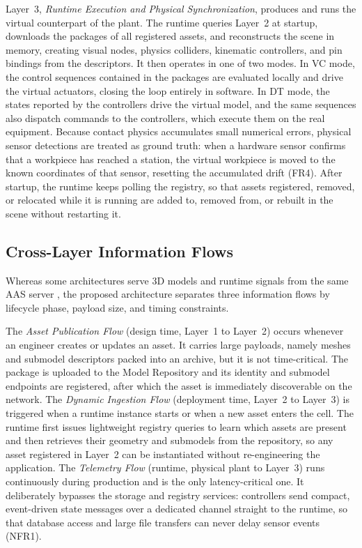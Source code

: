 \documentclass{ieeeojies}
\begin{document}
Layer~3, \textit{Runtime Execution and Physical Synchronization}, produces and runs the virtual counterpart of the plant. The runtime queries Layer~2 at startup, downloads the packages of all registered assets, and reconstructs the scene in memory, creating visual nodes, physics colliders, kinematic controllers, and pin bindings from the descriptors. It then operates in one of two modes. In VC mode, the control sequences contained in the packages are evaluated locally and drive the virtual actuators, closing the loop entirely in software. In DT mode, the states reported by the controllers drive the virtual model, and the same sequences also dispatch commands to the controllers, which execute them on the real equipment. Because contact physics accumulates small numerical errors, physical sensor detections are treated as ground truth: when a hardware sensor confirms that a workpiece has reached a station, the virtual workpiece is moved to the known coordinates of that sensor, resetting the accumulated drift (FR4). After startup, the runtime keeps polling the registry, so that assets registered, removed, or relocated while it is running are added to, removed from, or rebuilt in the scene without restarting it.

\subsection{Cross-Layer Information Flows}
\label{sec:arch_flows}

Whereas some architectures serve 3D models and runtime signals from the same AAS server \cite{Pajpach2023}, the proposed architecture separates three information flows by lifecycle phase, payload size, and timing constraints.

The \textit{Asset Publication Flow} (design time, Layer~1 to Layer~2) occurs whenever an engineer creates or updates an asset. It carries large payloads, namely meshes and submodel descriptors packed into an archive, but it is not time-critical. The package is uploaded to the Model Repository and its identity and submodel endpoints are registered, after which the asset is immediately discoverable on the network. The \textit{Dynamic Ingestion Flow} (deployment time, Layer~2 to Layer~3) is triggered when a runtime instance starts or when a new asset enters the cell. The runtime first issues lightweight registry queries to learn which assets are present and then retrieves their geometry and submodels from the repository, so any asset registered in Layer~2 can be instantiated without re-engineering the application. The \textit{Telemetry Flow} (runtime, physical plant to Layer~3) runs continuously during production and is the only latency-critical one. It deliberately bypasses the storage and registry services: controllers send compact, event-driven state messages over a dedicated channel straight to the runtime, so that database access and large file transfers can never delay sensor events (NFR1).
\end{document}

